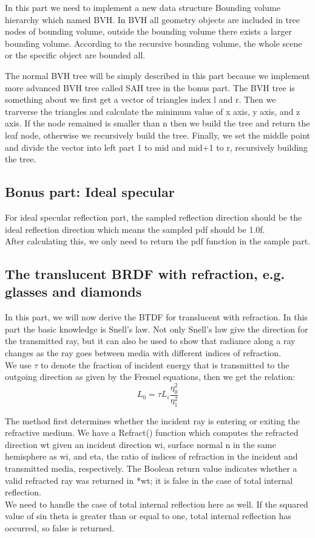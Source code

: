 \documentclass[acmtog]{acmart}
\begin{document}
In this part we need to implement a new data structure Bounding volume hierarchy which named BVH. In BVH all geometry objects are included
in tree nodes of bounding volume, outside the bounding volume there exists a larger bounding volume. According to the recursive bounding volume,
the whole scene or the specific object are bounded all.

The normal BVH tree will be simply described in this part because we implement more advanced BVH tree called SAH tree in the bonus part. The BVH tree is something about we first get a vector of triangles index l and r. Then we trarverse the triangles and calculate the minimum value of x axis, y axis, and z axis. If the node remained is smaller than n then we build the tree and return the leaf node, otherwise we recursively build the tree. Finally, we set the middle point and divide the vector into left part 1 to mid and mid+1 to r, recursively building the tree.

\subsection{Bonus part: Ideal specular}

For ideal specular reflection part, the sampled reflection direction should be the ideal reflection direction which means the sampled pdf should be 1.0f. \\
After calculating this, we only need to return the pdf function in the sample part. \\

\subsection{The translucent BRDF with refraction, e.g. glasses and diamonds}

In this part, we will now derive the BTDF for translucent with refraction. In this part the basic knowledge is Snell's law. Not only Snell’s law give the direction for the transmitted ray, but it can also be used to show that radiance along a ray changes as the ray goes between media with different indices of refraction. \\
We use $\tau$ to denote the fraction of incident energy that is transmitted to the outgoing direction as given by the Fresnel equations, then we get the relation:
$$L_0 = \tau L_i \frac{\eta_0^2}{\eta_1^2}$$

The method first determines whether the incident ray is entering or exiting the refractive medium. We have a Refract() function which computes the refracted direction wt given an incident direction wi, surface normal n in the same hemisphere as wi, and eta, the ratio of indices of refraction in the incident and transmitted media, respectively. The Boolean return value indicates whether a valid refracted ray was returned in *wt; it is false in the case of total internal reflection. \\
We need to handle the case of total internal reflection here as well. If the squared value of sin theta is greater than or equal to one, total internal reflection has occurred, so false is returned.
\end{document}
